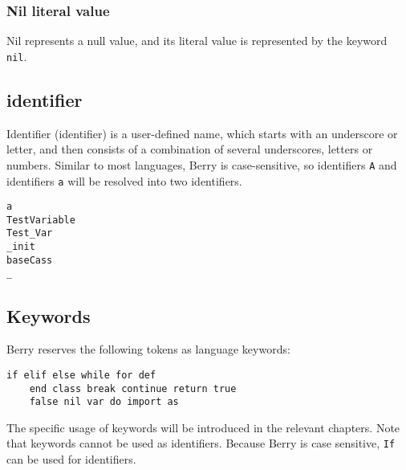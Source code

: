 \subsubsection {Nil literal value}

Nil represents a null value, and its literal value is represented by the keyword \texttt{nil}.

\subsection {identifier} \label{section::identifier}

Identifier (identifier)   is a user-defined name, which starts with an underscore or letter, and then consists of a combination of several underscores, letters or numbers. Similar to most languages, Berry is case-sensitive, so identifiers \texttt{A} and identifiers \texttt{a} will be resolved into two identifiers.
\begin{lstlisting}[language=berry, numbers=none]
a
TestVariable
Test_Var
_init
baseCass
_
\end{lstlisting}

\subsection{Keywords}

Berry reserves the following tokens as language keywords:
\begin{lstlisting}[language=berry, numbers=none]
    if elif else while for def
    end class break continue return true
    false nil var do import as
\end{lstlisting}

The specific usage of keywords will be introduced in the relevant chapters. Note that keywords cannot be used as identifiers. Because Berry is case sensitive, \texttt{If} can be used for identifiers.